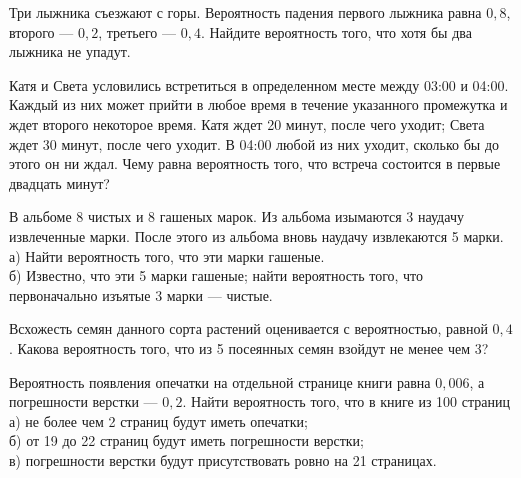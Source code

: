 \newpage\setcounter{zad}{0}



\begin{zkrW}{20}\noindent 
	Три лыжника съезжают с горы. Вероятность падения первого лыжника равна $0{,}8$, второго --- $0{,}2$, третьего --- $0{,}4$. Найдите вероятность того, что хотя бы два лыжника не упадут.
 
\end{zkrW}

\begin{zkrW}{20}\noindent 
	Катя и Света условились встретиться в определенном месте между 03:00 и 04:00. Каждый из них может прийти в любое время в течение указанного промежутка и ждет второго некоторое время. Катя ждет 20 минут, после чего уходит; Света ждет 30 минут, после чего уходит. В 04:00 любой из них уходит, сколько бы до этого он ни ждал. Чему равна вероятность того, что встреча состоится в первые двадцать минут?
 
\end{zkrW}

\begin{zkrW}{20}\noindent 
	В альбоме 8 чистых и 8 гашеных марок. Из альбома изымаются 3 наудачу извлеченные марки. После этого из альбома вновь наудачу извлекаются 5 марки. \\ \indent а) Найти вероятность того, что эти марки гашеные. \\ \indent б) Известно, что эти 5 марки гашеные; найти вероятность того, что первоначально изъятые 3 марки --- чистые.
 
\end{zkrW}

\begin{zkrW}{20}\noindent 
	Всхожесть семян данного сорта растений оценивается с вероятностью, равной $0{,}4$. Какова вероятность того, что из 5 посеянных семян взойдут не менее чем 3?
 
\end{zkrW}

\begin{zkrW}{20}\noindent 
	Вероятность появления опечатки на отдельной странице книги равна $0{,}006$, а погрешности верстки --- $0{,}2$. Найти вероятность того, что в книге из 100 страниц \\ \indent а) не более чем 2 страниц будут иметь опечатки; \\ \indent б) от 19 до 22 страниц будут иметь погрешности верстки; \\ \indent в) погрешности верстки будут присутствовать ровно на 21 страницах.
 
\end{zkrW}

